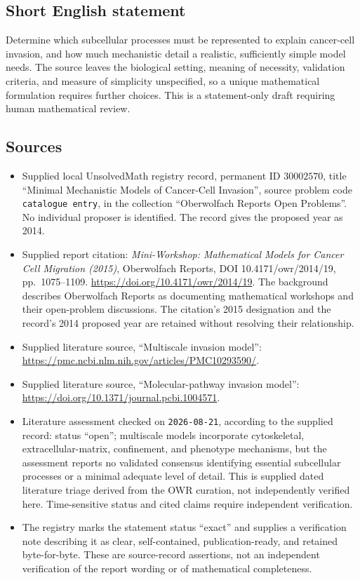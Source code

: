 \documentclass[11pt]{article}
\begin{document}
\subsection{Short English statement}
Determine which subcellular processes must be represented to explain cancer-cell invasion, and how much mechanistic detail a realistic, sufficiently simple model needs. The source leaves the biological setting, meaning of necessity, validation criteria, and measure of simplicity unspecified, so a unique mathematical formulation requires further choices. This is a statement-only draft requiring human mathematical review.
\subsection{Sources}
\begin{itemize}
\item Supplied local UnsolvedMath registry record, permanent ID \(30002570\), title ``Minimal Mechanistic Models of Cancer-Cell Invasion'', source problem code \texttt{catalogue entry}, in the collection ``Oberwolfach Reports Open Problems''. No individual proposer is identified. The record gives the proposed year as 2014.
\item Supplied report citation: \emph{Mini-Workshop: Mathematical Models for Cancer Cell Migration (2015)}, Oberwolfach Reports, DOI 10.4171/owr/2014/19, pp.\ 1075--1109. \url{https://doi.org/10.4171/owr/2014/19}. The background describes Oberwolfach Reports as documenting mathematical workshops and their open-problem discussions. The citation's 2015 designation and the record's 2014 proposed year are retained without resolving their relationship.
\item Supplied literature source, ``Multiscale invasion model'': \url{https://pmc.ncbi.nlm.nih.gov/articles/PMC10293590/}.
\item Supplied literature source, ``Molecular-pathway invasion model'': \url{https://doi.org/10.1371/journal.pcbi.1004571}.
\item Literature assessment checked on \texttt{2026-08-21}, according to the supplied record: status ``open''; multiscale models incorporate cytoskeletal, extracellular-matrix, confinement, and phenotype mechanisms, but the assessment reports no validated consensus identifying essential subcellular processes or a minimal adequate level of detail. This is supplied dated literature triage derived from the OWR curation, not independently verified here. Time-sensitive status and cited claims require independent verification.
\item The registry marks the statement status ``exact'' and supplies a verification note describing it as clear, self-contained, publication-ready, and retained byte-for-byte. These are source-record assertions, not an independent verification of the report wording or of mathematical completeness.
\end{itemize}
\end{document}
